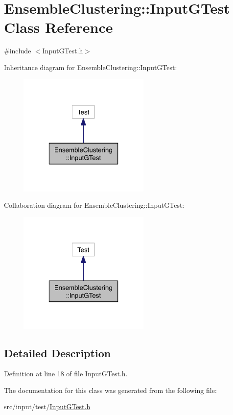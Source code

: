 \hypertarget{class_ensemble_clustering_1_1_input_g_test}{\section{Ensemble\-Clustering\-:\-:Input\-G\-Test Class Reference}
\label{class_ensemble_clustering_1_1_input_g_test}
}


{\ttfamily \#include $<$Input\-G\-Test.\-h$>$}



Inheritance diagram for Ensemble\-Clustering\-:\-:Input\-G\-Test\-:\nopagebreak
\begin{figure}[H]
\begin{center}
\leavevmode
\includegraphics[width=184pt]{class_ensemble_clustering_1_1_input_g_test__inherit__graph}
\end{center}
\end{figure}


Collaboration diagram for Ensemble\-Clustering\-:\-:Input\-G\-Test\-:\nopagebreak
\begin{figure}[H]
\begin{center}
\leavevmode
\includegraphics[width=184pt]{class_ensemble_clustering_1_1_input_g_test__coll__graph}
\end{center}
\end{figure}


\subsection{Detailed Description}


Definition at line 18 of file Input\-G\-Test.\-h.



The documentation for this class was generated from the following file\-:\begin{DoxyCompactItemize}
\item 
src/input/test/\hyperlink{_input_g_test_8h}{Input\-G\-Test.\-h}\end{DoxyCompactItemize}

